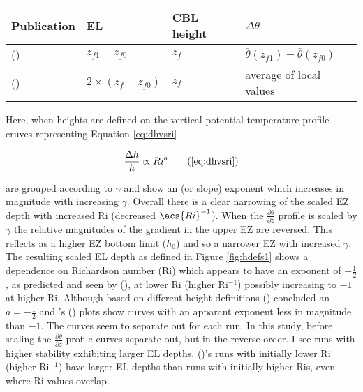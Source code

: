 \begin{table}[htbp]
\label{table:el}
\begin{center}
\begin{tabular}{ p{5cm} p{4cm} p{2cm} p{2cm}}
Publication & \acs{EL} & \acs{CBL} height & $\Delta \theta$\\ \hline
\citeauthor{FedConzMir04} (\citeyear{FedConzMir04}) & $z_{f1} - z_{f0}$ & $z_{f}$ &  $\overline{\theta}(z_{f1})-\overline{\theta}(z_{f0})$\\ [.3cm] %
\citeauthor{BrooksFowler2} (\citeyear{BrooksFowler2}) & $2 \times (z_{f} - z_{f0})$ & $z_{f}$ & average of local values\\ \hline
\end{tabular}
\end{center}    
\end{table}


Here, when heights are defined on the vertical potential temperature profile cruves representing Equation \ref{eq:dhvsri} 

\begin{equation}
\frac{\Delta h}{h} \propto Ri ^{b} \tag{\ref{eq:dhvsri}}
\end{equation}

are grouped according to $\gamma$ and show an (or slope) exponent which increases in magnitude with increasing $\gamma$.  Overall there is a clear narrowing of the scaled \acs{EZ} depth with increased \acs{Ri} (decreased $\acs{Ri}^{-1}$).   When the $\frac{\partial \overline{\theta}}{\partial z}$ profile is scaled by $\gamma$ the relative magnitudes of the gradient in the upper \acs{EZ} are reversed.  This reflects as a higher \acs{EZ} bottom limit ($h_{0}$) and so a narrower \acs{EZ} with increased $\gamma$.  The resulting scaled \acs{EL} depth as defined in Figure \ref{fig:hdefs1} shows a dependence on Richardson number (\acs{Ri}) which appears to have an exponent of $-\frac{1}{2}$, as predicted and seen by \citeauthor{Boers89} (\citeyear{Boers89}), at lower \acs{Ri} (higher \acs{Ri}$^{-1}$) possibly increasing to $-1$ at higher \acs{Ri}.  Although based on different height definitions \citeauthor{FedConzMir04} (\citeyear{FedConzMir04}) concluded an $a = -\frac{1}{2}$ and \citeauthor{BrooksFowler2}'s (\citeyear{BrooksFowler2}) plots show curves with an apparant exponent less in magnitude than $-1$. The curves seem to separate out for each run.  In this study, before scaling the $\frac{\partial \overline{\theta}}{\partial z}$ profile curves separate out, but in the reverse order.  I see runs with higher stability exhibiting larger \acs{EL} depths.  \citeauthor{BrooksFowler2} (\citeyear{BrooksFowler2})'s runs with initially lower \acs{Ri} (higher \acs{Ri}$^{-1}$) have larger \acs{EL} depths than runs with initially higher \acs{Ri}s, even where \acs{Ri} values overlap.\\     

